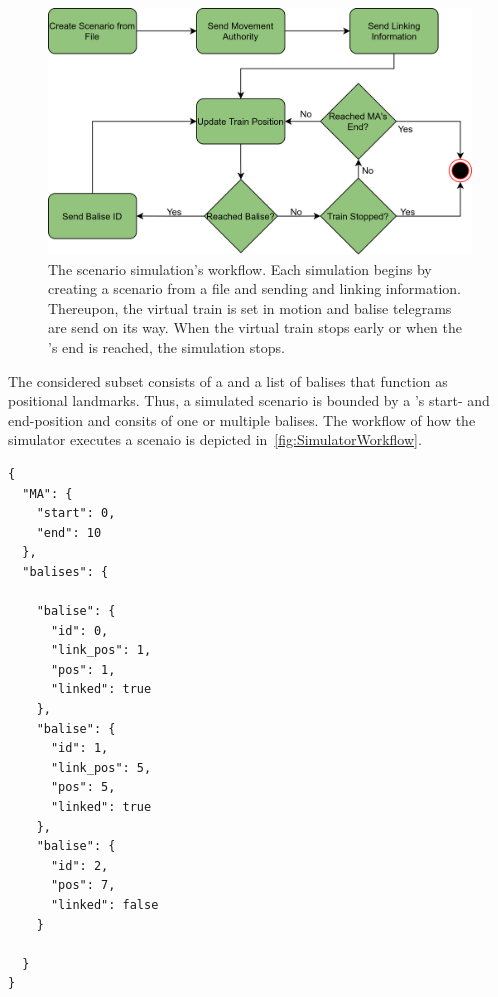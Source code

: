 \begin{figure}[!hb]
	\centering
	\includegraphics[width=0.75\linewidth]{images/SimulatorWorkflow}
	\caption{The scenario simulation's workflow. Each simulation begins by creating a scenario from a file and sending  and linking information. Thereupon, the virtual train is set in motion and balise telegrams are send on its way. When the virtual train stops early or when the 's end is reached, the simulation stops.}
	\label{fig:SimulatorWorkflow}
\end{figure}

The considered  subset consists of a  and a list of balises that function as positional landmarks.
Thus, a simulated scenario is bounded by a 's start- and end-position and consits of one or multiple balises.
The workflow of how the simulator executes a scenaio is depicted in~\autoref{fig:SimulatorWorkflow}.

\begin{lstlisting}[caption={A JSON scenario representation. Each scenario consists of a \glsentryfull{MA} with a start and end point, as well as of a set of balises. Balises can be either linked or not and consist of an identification number, a linking position and an actual position. The linking position is transmitted to the on-board unit and is distinguished from its actual position to simulate a misplaced balise.}, label=code:scenarioJSON]
{
  "MA": {
    "start": 0,
    "end": 10
  },
  "balises": {

    "balise": {
      "id": 0,
      "link_pos": 1,
      "pos": 1,
      "linked": true
    },
    "balise": {
      "id": 1,
      "link_pos": 5,
      "pos": 5,
      "linked": true
    },
    "balise": {
      "id": 2,
      "pos": 7,
      "linked": false
    }

  }
}

\end{lstlisting}

